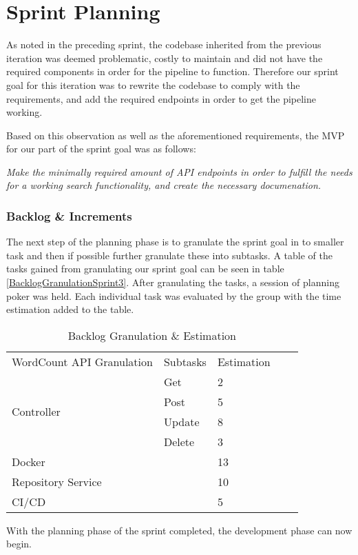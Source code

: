 \section{Sprint Planning}
As noted in the preceding sprint, the codebase inherited from the previous iteration was deemed problematic, costly to maintain and did not have the required components in order for the pipeline to function. 
Therefore our sprint goal for this iteration was to rewrite the codebase to comply with the requirements, and add the required endpoints in order to get the pipeline working. 


Based on this observation as well as the aforementioned requirements, the MVP for our part of the sprint goal was as follows:
\vspace{\baselineskip}

\textit{Make the minimally required amount of API endpoints in order to fulfill the needs for a working search functionality, and create the necessary documenation.}

\subsubsection{Backlog \& Increments}
The next step of the planning phase is to granulate the sprint goal in to smaller task and then if possible further granulate these into subtasks. 
A table of the tasks gained from granulating our sprint goal can be seen in table \ref{BacklogGranulationSprint3}. 
After granulating the tasks, a session of planning poker was held. Each individual task was evaluated by the group with the time estimation added to the table. 
\begin{table}[h]
\centering
\begin{tabular}{|l|l|l|ll}
\cline{1-3}
WordCount API Granulation   & Subtasks & Estimation &  &  \\ \cline{1-3}
\multirow{4}{*}{Controller} & Get      & 2          &  &  \\ \cline{2-3}
                            & Post     & 5          &  &  \\ \cline{2-3}
                            & Update   & 8          &  &  \\ \cline{2-3}
                            & Delete   & 3          &  &  \\ \cline{1-3}
Docker                      &          & 13         &  &  \\ \cline{1-3}
Repository Service          &          & 10         &  &  \\ \cline{1-3}
CI/CD                       &          & 5          &  &  \\ \cline{1-3}
\end{tabular}
\caption{Backlog Granulation \& Estimation}
\label{BacklogEstimationSprint3}
\end{table}

With the planning phase of the sprint completed, the development phase can now begin. 




